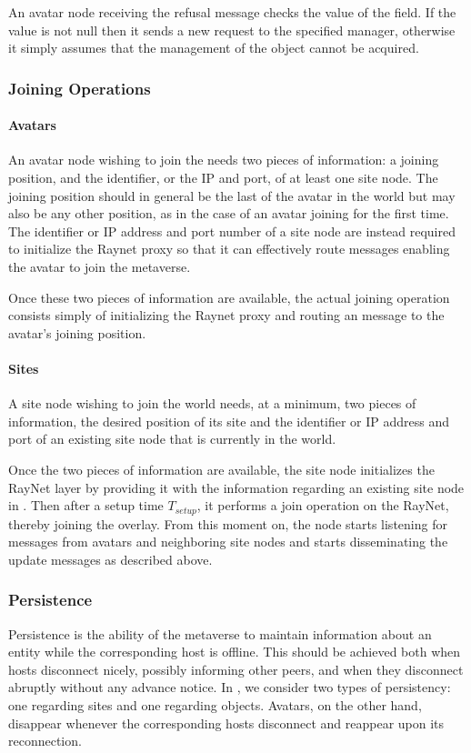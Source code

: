 An avatar node receiving the refusal message checks the value of the
\manager field. If the value is not null then it sends a new request
to the specified manager, otherwise it simply assumes that the
management of the object cannot be acquired. 


\subsubsection{Joining Operations}
\paragraph{Avatars}
An avatar node wishing to join the \sol needs two pieces of
information: a joining position, and the identifier, or the IP and
port, of at least one site node. The joining position should in
general be the last of the avatar in the \sol world but may also be
any other position, as in the case of an avatar joining for the first
time. The identifier or IP address and port number of a site node are
instead required to initialize the Raynet proxy so that it can
effectively route messages enabling the avatar to join the \sol
metaverse.

Once these two pieces of information are available, the actual joining
operation consists simply of initializing the Raynet proxy and routing
an \avhb message to the avatar's joining position.


\paragraph{Sites}
A site node wishing to join the \sol world needs, at a minimum, two pieces of information,
the desired position of its site and the identifier or IP address
and port of an existing site node that is currently in the \sol
world. 

Once the two pieces of information are available, the site node
initializes the RayNet layer by providing it with the information
regarding an existing site node in \sol. Then after a setup time
$T_{setup}$, it performs a join operation on the RayNet, thereby
joining the overlay. From this moment on, the node starts listening
for messages from avatars and neighboring site nodes and starts
disseminating the update messages as described above. 
 

\subsubsection{Persistence}
Persistence is the ability of the \sol metaverse to maintain
information about an entity while the corresponding host is
offline. This should be achieved both when hosts disconnect nicely,
possibly informing other peers, and when they disconnect abruptly
without any advance notice. In \sol, we consider two types of
persistency: one regarding sites and one regarding objects. Avatars,
on the other hand, disappear whenever the corresponding hosts
disconnect and reappear upon its reconnection.

